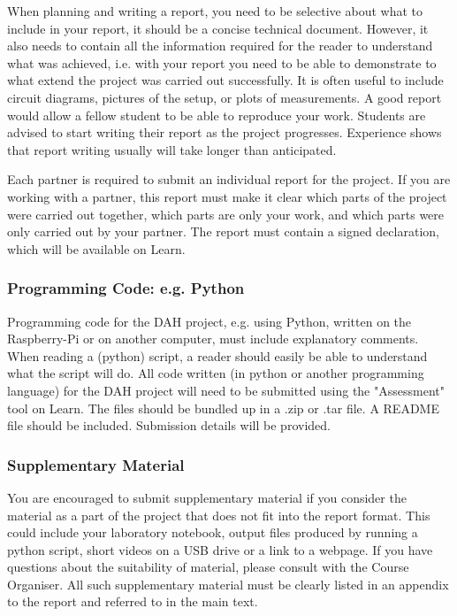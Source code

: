 When planning and writing a report, you need to be selective about what to include in your report, it should be a concise technical document. However, it also needs to contain all the information required for the reader to understand what was achieved, i.e. with your report you need to be able to demonstrate to what extend the project was carried out successfully. It is often useful to include circuit diagrams, pictures of the setup, or plots of measurements. A good report would allow a fellow student to be able to reproduce your work. Students are advised to start writing their report as the project progresses. Experience shows that report writing usually will take longer than anticipated.

Each partner is required to submit an individual report for the project. If you are working with a partner, this report must make it clear which parts of the project were carried out together, which parts are only your work, and which parts were only carried out by your partner. The report must contain a signed declaration, which will be available on Learn.

\subsubsection{Programming Code: e.g. Python}

Programming code for the DAH project, e.g. using Python, written on the Raspberry-Pi or on another computer, must include explanatory comments. When reading a (python) script, a reader should easily be able to understand what the script will do. All code written (in python or another programming language)  for the DAH project will need to be submitted using the "Assessment" tool on Learn.  The files should be bundled up in a .zip or .tar file. A README file should be included. Submission details will be provided.

\subsubsection{Supplementary Material}

You are encouraged to submit supplementary material if you consider the material as a part of the project that does not fit into the report format. This could include your laboratory notebook, output files produced by running a python script, short videos on a USB drive or a link to a webpage. If you have questions about the suitability of material, please consult with the Course Organiser. All such supplementary material must be clearly listed in an appendix to the report and referred to in the main text. 

